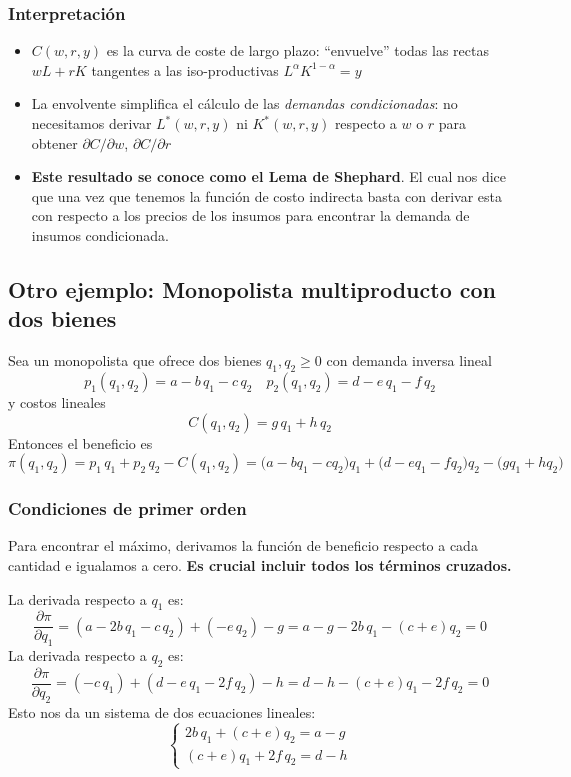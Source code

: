 \documentclass{article}
\begin{document}
\subsubsection*{Interpretación}

\begin{itemize}
  \item \(C(w,r,y)\) es la curva de coste de largo plazo: “envuelve” todas las rectas
    \(wL + rK\) tangentes a las iso-productivas \(L^\alpha K^{1-\alpha}=y\)  
  \item La envolvente simplifica el cálculo de las \emph{demandas condicionadas}: no necesitamos
    derivar \(L^*(w,r,y)\) ni \(K^*(w,r,y)\) respecto a \(w\) o \(r\) para obtener \(\partial C/\partial w\),
    \(\partial C/\partial r\)  
  \item \textbf{\color{teal}Este resultado se conoce como el Lema de Shephard}. El cual nos dice que una vez que tenemos la función de costo indirecta basta con derivar esta con respecto a los precios de los insumos para encontrar la demanda de insumos condicionada.
  \end{itemize}


\subsection*{Otro ejemplo: Monopolista multiproducto con dos bienes}

Sea un monopolista que ofrece dos bienes \(q_{1},q_{2}\ge0\) con demanda inversa lineal
\[
p_{1}(q_{1},q_{2}) = a - b\,q_{1} - c\,q_{2}
\quad
p_{2}(q_{1},q_{2}) = d - e\,q_{1} - f\,q_{2}
\]
y costos lineales
\[
C(q_{1},q_{2}) = g\,q_{1} + h\,q_{2}
\]
Entonces el beneficio es
\[
\pi(q_{1},q_{2})
= p_{1}\,q_{1} + p_{2}\,q_{2} - C(q_{1},q_{2})
= \bigl(a - bq_{1} - cq_{2}\bigr)q_{1}
+ \bigl(d - eq_{1} - fq_{2}\bigr)q_{2}
- \bigl(gq_{1} + hq_{2}\bigr)
\]

\subsubsection*{Condiciones de primer orden}

Para encontrar el máximo, derivamos la función de beneficio respecto a cada cantidad e igualamos a cero. \textbf{Es crucial incluir todos los términos cruzados.}

La derivada respecto a \(q_1\) es:
\[
\frac{\partial\pi}{\partial q_{1}}
= (a - 2b\,q_{1} - c\,q_{2}) + (-e\,q_2) - g = a - g - 2b\,q_{1} - (c+e)q_{2} = 0
\]
La derivada respecto a \(q_2\) es:
\[
\frac{\partial\pi}{\partial q_{2}}
= (-c\,q_1) + (d - e\,q_{1} - 2f\,q_{2}) - h = d - h - (c+e)q_{1} - 2f\,q_{2} = 0
\]
Esto nos da un sistema de dos ecuaciones lineales:
\[
\begin{cases}
2b\,q_{1} + (c+e)q_{2} = a - g \\
(c+e)q_{1} + 2f\,q_{2} = d - h
\end{cases}
\]
\end{document}
